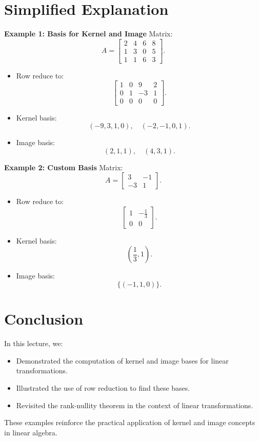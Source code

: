 \documentclass{article}
\begin{document}
\section*{Simplified Explanation}

\textbf{Example 1: Basis for Kernel and Image}
Matrix:
\[
  A =
  \begin{bmatrix}
    2 & 4 & 6 & 8 \\
    1 & 3 & 0 & 5 \\
    1 & 1 & 6 & 3
  \end{bmatrix}.
\]
\begin{itemize}
  \item Row reduce to:
    \[
      \begin{bmatrix}
        1 & 0 & 9 & 2 \\
        0 & 1 & -3 & 1 \\
        0 & 0 & 0 & 0
      \end{bmatrix}.
    \]
  \item Kernel basis:
    \[
      (-9, 3, 1, 0), \quad (-2, -1, 0, 1).
    \]
  \item Image basis:
    \[
      (2, 1, 1), \quad (4, 3, 1).
    \]
\end{itemize}

\textbf{Example 2: Custom Basis}
Matrix:
\[
  A =
  \begin{bmatrix}
    3 & -1 \\
    -3 & 1
  \end{bmatrix}.
\]
\begin{itemize}
  \item Row reduce to:
    \[
      \begin{bmatrix}
        1 & -\frac{1}{3} \\
        0 & 0
      \end{bmatrix}.
    \]
  \item Kernel basis:
    \[
      \left(\frac{1}{3}, 1\right).
    \]
  \item Image basis:
    \[
      \{(-1, 1, 0)\}.
    \]
\end{itemize}

\section*{Conclusion}

In this lecture, we:
\begin{itemize}
  \item Demonstrated the computation of kernel and image bases for linear transformations.
  \item Illustrated the use of row reduction to find these bases.
  \item Revisited the rank-nullity theorem in the context of linear transformations.
\end{itemize}

These examples reinforce the practical application of kernel and image concepts in linear algebra.
\end{document}
